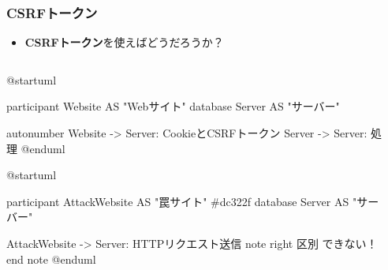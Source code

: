 \begin{frame}[fragile]
  \frametitle{CSRFトークン}

  \begin{itemize}
    \item \textbf{CSRFトークン}を使えばどうだろうか？
  \end{itemize}

  \begin{columns}
    \begin{column}{.35\textwidth}
      \begin{minipage}{.85\textwidth}
        \begin{plantuml}
          @startuml
          
          participant Website AS "Webサイト"
          database Server AS "サーバー"
       
          autonumber
          Website -> Server: CookieとCSRFトークン
          Server -> Server: 処理
          @enduml
        \end{plantuml}
      \end{minipage}

      \pause
      \begin{minipage}{\textwidth}
        \begin{plantuml}
          @startuml
          
          participant AttackWebsite AS "罠サイト" #dc322f
          database Server AS "サーバー"
          
          AttackWebsite -> Server: HTTPリクエスト送信
          note right
            区別
            できない！
          end note
          @enduml
        \end{plantuml}
      \end{minipage}
    \end{column}
    \begin{column}{.65\textwidth}
       
      \pause
    \end{column}
  \end{columns}
\end{frame}

